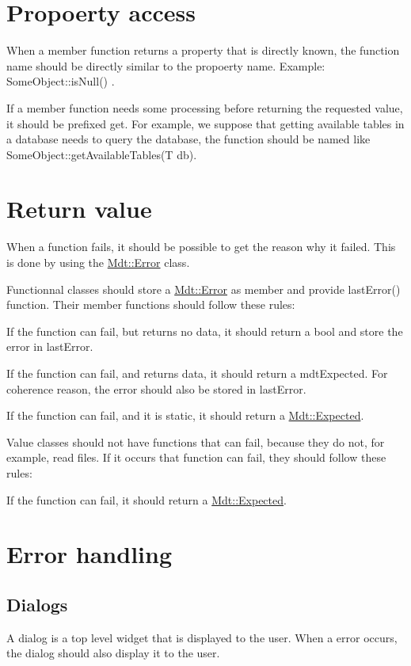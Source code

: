 \hypertarget{guideline_page_getters}{}\section{Propoerty access}\label{guideline_page_getters}
When a member function returns a property that is directly known, the function name should be directly similar to the propoerty name. Example\+: Some\+Object\+::is\+Null() .

If a member function needs some processing before returning the requested value, it should be prefixed get. For example, we suppose that getting available tables in a database needs to query the database, the function should be named like Some\+Object\+::get\+Available\+Tables(\+T db).\hypertarget{guideline_page_return_value}{}\section{Return value}\label{guideline_page_return_value}
When a function fails, it should be possible to get the reason why it failed. This is done by using the \hyperlink{class_mdt_1_1_error}{Mdt\+::\+Error} class.

Functionnal classes should store a \hyperlink{class_mdt_1_1_error}{Mdt\+::\+Error} as member and provide last\+Error() function. Their member functions should follow these rules\+:
\begin{DoxyItemize}
\item If the function can fail, but returns no data, it should return a bool and store the error in last\+Error.
\item If the function can fail, and returns data, it should return a mdt\+Expected. For coherence reason, the error should also be stored in last\+Error.
\item If the function can fail, and it is static, it should return a \hyperlink{class_mdt_1_1_expected}{Mdt\+::\+Expected}.
\end{DoxyItemize}

Value classes should not have functions that can fail, because they do not, for example, read files. If it occurs that function can fail, they should follow these rules\+:
\begin{DoxyItemize}
\item If the function can fail, it should return a \hyperlink{class_mdt_1_1_expected}{Mdt\+::\+Expected}.
\end{DoxyItemize}\hypertarget{guideline_page_error_handlig}{}\section{Error handling}\label{guideline_page_error_handlig}
\hypertarget{guideline_page_error_handlig_dialog}{}\subsection{Dialogs}\label{guideline_page_error_handlig_dialog}
A dialog is a top level widget that is displayed to the user. When a error occurs, the dialog should also display it to the user.

